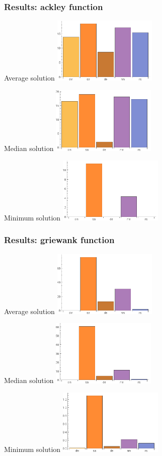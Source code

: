 \documentclass[mathserif]{beamer}
\begin{document}
\begin{frame}[allowframebreaks]
    \frametitle{Results: ackley function}

    Average solution
    \includegraphics[width=5cm]{../figures/average-fun-ackley.png}

    Median solution
    \includegraphics[width=5cm]{../figures/median-fun-ackley.png}

    Minimum solution
    \includegraphics[width=5cm]{../figures/minimum-fun-ackley.png}
\end{frame}

\begin{frame}[allowframebreaks]
    \frametitle{Results: griewank function}

    Average solution
    \includegraphics[width=5cm]{../figures/average-fun-griewank.png}

    Median solution
    \includegraphics[width=5cm]{../figures/median-fun-griewank.png}

    Minimum solution
    \includegraphics[width=5cm]{../figures/minimum-fun-griewank.png}
\end{frame}
\end{document}
